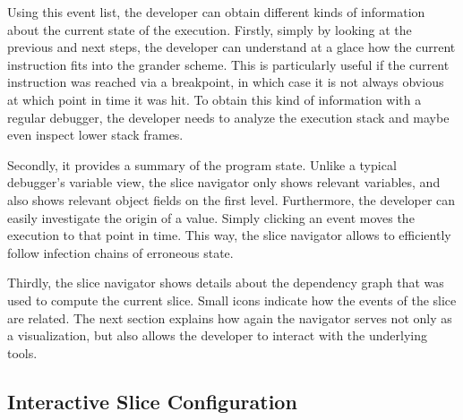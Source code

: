 \documentclass[english]{scrartcl}
\begin{document}
Using this event list, the developer can obtain different kinds of information about the current state of the execution.
Firstly, simply by looking at the previous and next steps, the developer can understand at a glace how the current instruction fits into the grander scheme.
This is particularly useful if the current instruction was reached via a breakpoint, in which case it is not always obvious at which point in time it was hit.
To obtain this kind of information with a regular debugger, the developer needs to analyze the execution stack and maybe even inspect lower stack frames.

Secondly, it provides a summary of the program state.
Unlike a typical debugger's variable view, the slice navigator only shows relevant variables, and also shows relevant object fields on the first level.
Furthermore, the developer can easily investigate the origin of a value.
Simply clicking an event moves the execution to that point in time.
This way, the slice navigator allows to efficiently follow infection chains of erroneous state.

Thirdly, the slice navigator shows details about the dependency graph that was used to compute the current slice.
Small icons indicate how the events of the slice are related.
The next section explains how again the navigator serves not only as a visualization, but also allows the developer to interact with the underlying tools.

\subsection{Interactive Slice Configuration}

\end{document}
